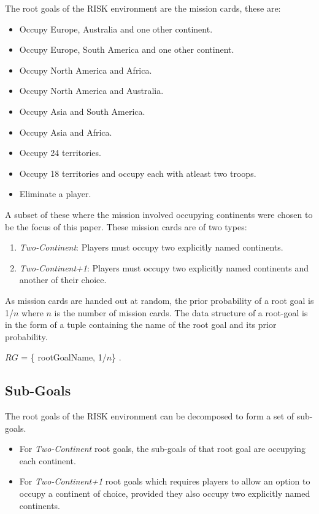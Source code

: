 \documentclass[parskip]{cs4rep}
\begin{document}
The root goals of the RISK environment are the mission cards, these are:

\begin{itemize}
\item
Occupy Europe, Australia and one other continent.
\item
Occupy Europe, South America and one other continent.
\item
Occupy North America and Africa.
\item
Occupy North America and Australia.
\item
Occupy Asia and South America.
\item
Occupy Asia and Africa.
\item
Occupy 24 territories.
\item
Occupy 18 territories and occupy each with atleast two troops.
\item
Eliminate a player.
\newline
\end{itemize}

A subset of these where the mission involved occupying continents were chosen to be the focus of this paper. These mission cards are of two types:

\begin{enumerate}
\item
\textit{Two-Continent}: Players must occupy two explicitly named continents.
\item
\textit{Two-Continent+1}: Players must occupy two explicitly named continents and another of their choice.
\end{enumerate}

As mission cards are handed out at random, the prior probability of a root goal is 1/$n$ where $n$ is the number of mission cards. The data structure of a root-goal is in the form of a tuple containing the name of the root goal and its prior probability.

\centerline{
 $RG$ = \{ rootGoalName, 1/$n$\} .
}

\subsection{Sub-Goals}

The root goals of the RISK environment can be decomposed to form a set of sub-goals. 

\begin{itemize}
\item
For \textit{Two-Continent} root goals, the sub-goals of that root goal are occupying each continent. 
\item
For \textit{Two-Continent+1} root goals which requires players to allow an option to occupy a continent of choice, provided they also occupy two explicitly named continents. 
\end{itemize}
\end{document}
